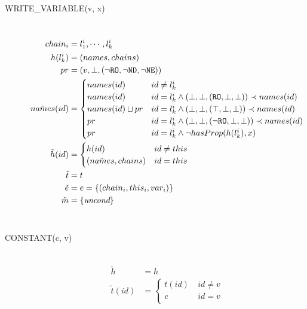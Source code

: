 \begin{description}
  \item[{\small\ttfamily WRITE\_VARIABLE(v, x)}] ~\\%
  \[
  \begin{aligned}
    chain_i &= l^{i}_{1}, \cdots, l^{i}_{k} \\
    h(l^{i}_{k}) &= (names, chains) \\
    pr &= (v, \bot, (\lnot\texttt{RO}, \lnot\texttt{ND}, \lnot\texttt{NE}))
    \\
    \tilde{names}(id)&= \begin{cases}
      names(id) & id \neq l^{i}_{k} \\
      names(id) &
	id = l^{i}_{k} \land (\bot, \bot, (\mathtt{RO}, \bot, \bot)) \prec names(id)\\
      names(id) \sqcup pr & 
	id = l^{i}_{k} \land (\bot, \bot, (\top, \bot, \bot)) \prec names(id) \\
      pr &
	id = l^{i}_{k} \land (\bot, \bot, (\lnot \mathtt{RO}, \bot, \bot)) \prec names(id)\\
      pr &
	id = l^{i}_{k} \land \lnot hasProp(h(l^{i}_{k}), x) \\
    \end{cases} \\
    \tilde{h}(id) &= 
    \begin{cases}
       h(id) & id \neq this\\
       (\tilde{names}, chains) & id = this \\
    \end{cases} \\
    \tilde{t} &= t \\
    \tilde{e} &= e = \{(chain_i, this_i, var_i)\} \\ 
    \tilde{m} &= \{\emph{uncond}\} \\
  \end{aligned}
  \]
  \\
  \item[{\small\ttfamily CONSTANT(c, v)}] ~\\%
  \[
  \begin{aligned}
    \tilde{h} &= h\\
    \tilde{t}(id) &= 
      \begin{cases}
	t(id) &\: id \neq v \\
	c &\: id = v \\

\end{cases}
\end{aligned}\]
\end{description}

